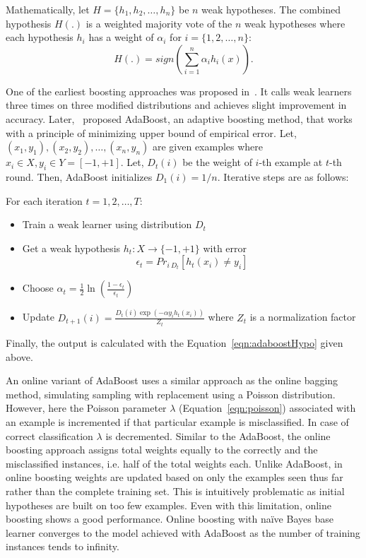 Mathematically, let $H= \{h_1, h_2, \dots, h_n\}$ be $n$ weak hypotheses. The combined hypothesis $H(.)$ is a weighted majority vote of the $n$ weak hypotheses where each hypothesis $h_i$ has a weight of $\alpha_i$ for $i = \{1, 2, \dots, n\}$:
\begin{equation}
\label{eqn:adaboostHypo}
    H(.) = sign \left(\sum_{i=1}^n \alpha_i h_i(x) \right).
\end{equation}

One of the earliest boosting approaches was proposed in~\cite{schapire90:whyens}. It calls weak learners three times on three modified distributions and achieves slight improvement in accuracy. Later,~\cite{freund97:boosting} proposed AdaBoost, an adaptive boosting method, that works with a principle of minimizing upper bound of empirical error. Let, $(x_1, y_1), (x_2, y_2), \dots, (x_n, y_n)$ are given examples where $x_i \in X, y_i \in Y = [-1, +1]$. Let, $D_t (i)$ be the weight of $i$-th example at $t$-th round. Then, AdaBoost initializes $D_1(i) =1/n$. Iterative steps are as follows:

For each iteration $t= 1, 2, \dots, T$:
\begin{itemize}
    \item Train a weak learner using distribution $D_t$
    \item Get a weak hypothesis $h_t : X \rightarrow \{-1, +1\}$ with error
    \[
        \epsilon_t = Pr_{i ~ D_t} [h_t(x_i) \ne y_i]
    \]
    \item Choose $\alpha_t = \frac{1}{2} \ln \left( \frac{1 - \epsilon_t}{\epsilon_t} \right)$
    \item Update $D_{t+1} (i) = \frac{D_t(i) \exp(-\alpha y_i h_t(x_i))}{Z_t}$ where $Z_t$ is a normalization factor
\end{itemize}
Finally, the output is calculated with the Equation~\ref{eqn:adaboostHypo} given above.

An online variant of AdaBoost uses a similar approach as the online bagging method, simulating sampling with replacement using a Poisson distribution. However, here the Poisson parameter $\lambda$ (Equation~\ref{eqn:poisson}) associated with an example is incremented if that particular example is misclassified. In case of correct classification $\lambda$ is decremented. Similar to the AdaBoost, the online boosting approach assigns total weights equally to the correctly and the misclassified instances, i.e. half of the total weights each. Unlike AdaBoost, in online boosting weights are updated based on only the examples seen thus far rather than the complete training set. This is intuitively problematic as initial hypotheses are built on too few examples. Even with this limitation, online boosting shows a good performance. Online boosting with na\"ive Bayes base learner converges to the model achieved with AdaBoost as the number of training instances tends to infinity.

